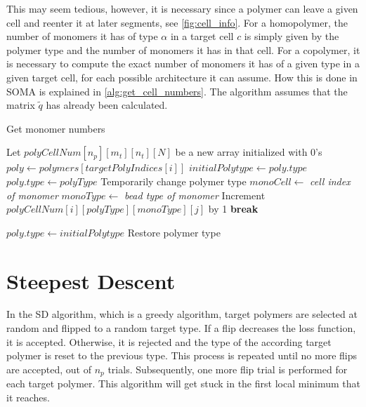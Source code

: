 \documentclass[bachelor,       %
               oneside,        %
               BCOR10mm,       %
               ngerman, english %
               ]{GAUBM}
\begin{document}
This may seem tedious, however, it is necessary since a polymer can leave a given cell and reenter it at later segments, see \autoref{fig:cell_info}. For a homopolymer, the number of monomers it has of type $\alpha$ in a target cell $c$ is simply given by the polymer type and the number of monomers it has in that cell. For a copolymer, it is necessary to compute the exact number of monomers it has of a given type in a given target cell, for each possible architecture it can assume. How this is done in \ac{SOMA} is explained in \autoref{alg:get_cell_numbers}. The algorithm assumes that the matrix $\tilde q$ has already been calculated. 

\begin{algorithm}[H]
\caption{Get monomer numbers}\label{alg:get_cell_numbers}
\begin{algorithmic}[1]
\State Let $polyCellNum[n_p][m_t][n_t][N]$ be a new array initialized with $0$'s
    \State $poly \gets polymers[targetPolyIndices[i]]$
    \State $initialPolytype\gets poly.type$
        \State $poly.type\gets polyType$
        \Comment Temporarily change polymer type
            \State $monoCell\gets$ \textit{cell index of monomer}
            \State $monoType\gets$ \textit{bead type of monomer}
                \State Increment $polyCellNum[i][polyType][monoType][j]$ by 1 
                \State \textbf{break}
            \EndIf
            \EndFor
        \EndFor
    \EndFor
    
    \State $poly.type\gets initialPolytype$
    \Comment Restore polymer type
\EndFor
\end{algorithmic}
\end{algorithm}



\section{Steepest Descent}

In the \ac{SD} algorithm, which is a greedy algorithm, target polymers are selected at random and flipped to a random target type. If a flip decreases the loss function, it is accepted. Otherwise, it is rejected and the type of the according target polymer is reset to the previous type. This process is repeated until no more flips are accepted, out of $n_p$ trials. Subsequently, one more flip trial is performed for each target polymer. This algorithm will get stuck in the first local minimum that it reaches.
\end{document}
